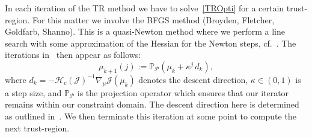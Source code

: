 In each iteration of the TR method we have to solve~\eqref{TROpti} for a certain trust-region.
For this matter we involve the BFGS method (Broyden, Fletcher, Goldfarb, Shanno).
This is a quasi-Newton method where we perform a line search with some approximation of the Hessian for the Newton steps, cf.~\cite[Chapter 4]{Kelley1999}.
The iterations in~\cite{Keil2021} then appear as follows:
\begin{equation*}\label{BFGSStep}
    \mu_{k+1}(j) := \mathbb{P}_{\mathcal{P}} \left( \mu_k + \kappa^j \, d_k \right),
\end{equation*}
where $d_k = - {\mathcal{H}_c(\mathcal{J})}^{-1} \nabla_\mu \mathcal{J}(\mu_k)$ denotes the descent direction, $\kappa \in (0, 1)$ is a step size, and $\mathbb{P}_{\mathcal{P}}$ is the projection operator which ensures that our iterator remains within our constraint domain.
The descent direction here is determined as outlined in~\cite[Section 5.5.3]{Kelley1999}.
We then terminate this iteration at some point to compute the next trust-region.